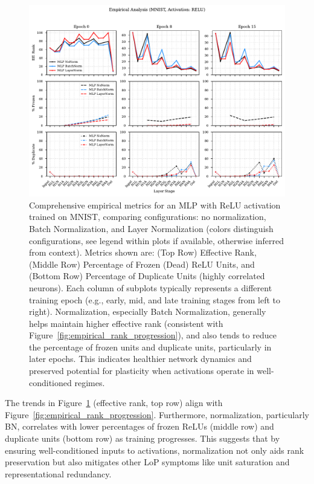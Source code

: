 \documentclass{article}
\begin{document}
\begin{figure}[h!]
    \centering
    \includegraphics[width=\textwidth]{empirical_all_metrics_ReLU_MNIST.pdf}
    \caption{Comprehensive empirical metrics for an MLP with ReLU activation trained on MNIST, comparing configurations: no normalization, Batch Normalization, and Layer Normalization (colors distinguish configurations, see legend within plots if available, otherwise inferred from context). Metrics shown are: (Top Row) Effective Rank, (Middle Row) Percentage of Frozen (Dead) ReLU Units, and (Bottom Row) Percentage of Duplicate Units (highly correlated neurons). Each column of subplots typically represents a different training epoch (e.g., early, mid, and late training stages from left to right). Normalization, especially Batch Normalization, generally helps maintain higher effective rank (consistent with Figure~\ref{fig:empirical_rank_progression}), and also tends to reduce the percentage of frozen units and duplicate units, particularly in later epochs. This indicates healthier network dynamics and preserved potential for plasticity when activations operate in well-conditioned regimes.}
    \label{fig:empirical_all_metrics}
\end{figure}

The trends in Figure~\ref{fig:empirical_all_metrics} (effective rank, top row) align with Figure~\ref{fig:empirical_rank_progression}. Furthermore, normalization, particularly BN, correlates with lower percentages of frozen ReLUs (middle row) and duplicate units (bottom row) as training progresses. This suggests that by ensuring well-conditioned inputs to activations, normalization not only aids rank preservation but also mitigates other LoP symptoms like unit saturation and representational redundancy.
\end{document}

